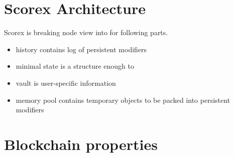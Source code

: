 
\section{Scorex Architecture}

Scorex is breaking node view into for following parts. 

\begin{itemize}
\item{history} contains log of persistent modifiers
\item{minimal state} is a structure enough to 
\item{vault} is user-specific information
\item{memory pool} contains temporary objects to be packed into persistent modifiers 
\end{itemize}

\section{Blockchain properties}
